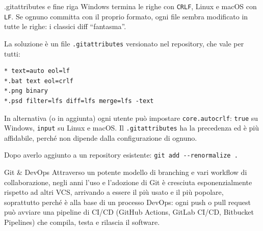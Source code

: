 \documentclass[aspectratio=169,handout,10pt]{beamer}
\begin{document}
\begin{frame}[fragile]{.gitattributes e fine riga}
    Windows termina le righe con \texttt{CRLF}, Linux e macOS con \texttt{LF}. Se ognuno committa con il proprio formato, ogni file sembra modificato in tutte le righe: i classici diff ``fantasma''.

    La soluzione è un file \texttt{.gitattributes} versionato nel repository, che vale per tutti:
    \begin{lstlisting}
* text=auto eol=lf
*.bat text eol=crlf
*.png binary
*.psd filter=lfs diff=lfs merge=lfs -text\end{lstlisting}
    In alternativa (o in aggiunta) ogni utente può impostare \lstinline{core.autocrlf}: \texttt{true} su Windows, \texttt{input} su Linux e macOS. Il \texttt{.gitattributes} ha la precedenza ed è più affidabile, perché non dipende dalla configurazione di ognuno.

    Dopo averlo aggiunto a un repository esistente: \lstinline{git add --renormalize .}
\end{frame}
\begin{frame}{Git \& DevOps}
    Attraverso un potente modello di branching e vari workflow
    di collaborazione, negli anni l'uso e l'adozione di Git è
    cresciuta esponenzialmente rispetto ad altri VCS, arrivando
    a essere il più usato e il più popolare, soprattutto perché è
    alla base di un processo DevOps: ogni push o pull request
    può avviare una pipeline di CI/CD (GitHub Actions, GitLab CI/CD,
    Bitbucket Pipelines) che compila, testa e rilascia il software.
\end{frame}
\end{document}
